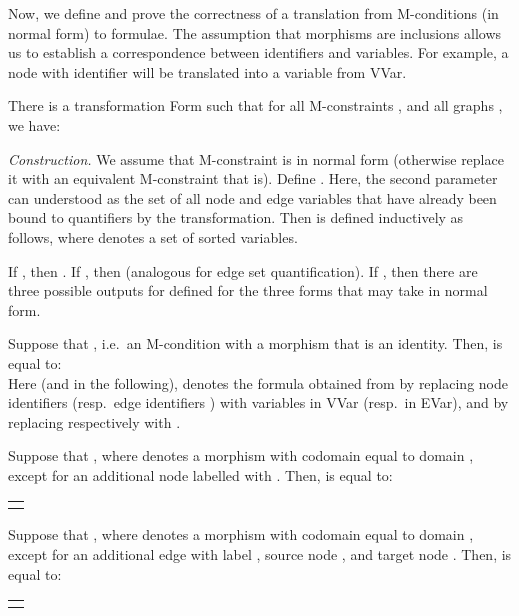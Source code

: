 \documentclass{llncs}
\begin{document}
	Now, we define and prove the correctness of a translation from M-conditions (in normal form) to formulae. The assumption that morphisms are inclusions allows us to establish a correspondence between identifiers and variables. For example, a node with identifier  will be translated into a variable  from VVar.
	
	\begin{theorem}\label{thm:Form}\rm
		There is a transformation Form such that for all M-constraints , and all graphs , we have:

		

		\noindent \emph{Construction.} We assume that M-constraint  is in normal form (otherwise replace it with an equivalent M-constraint that is). Define . Here, the second parameter can understood as the set of all node and edge variables that have already been bound to quantifiers by the transformation. Then  is defined inductively as follows, where  denotes a set of sorted variables.

		If , then . If , then  (analogous for edge set quantification). If , then there are three possible outputs for  defined for the three forms that  may take in normal form.

		Suppose that , i.e.\ an M-condition with a morphism that is an identity. Then,  is equal to:\\
		


	\noindent Here (and in the following),  denotes the formula obtained from  by replacing node identifiers  (resp.\ edge identifiers ) with variables  in VVar (resp.\  in EVar), and by replacing  respectively with .



		Suppose that , where  denotes a morphism with codomain  equal to domain , except for an additional node  labelled with . Then,  is equal to:

		\begin{center}
		\begin{tabular}{l}
			\vspace{5pt}
		\end{tabular}
		\end{center}

		Suppose that , where  denotes a morphism with codomain  equal to domain , except for an additional edge  with label , source node , and target node . Then,  is equal to:

		\begin{center}
		\begin{tabular}{l}
			\vspace{5pt}\\
			

\end{tabular}
\end{center}
\end{theorem}
\end{document}
